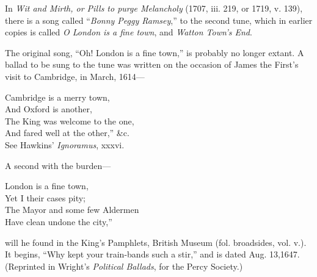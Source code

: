 In \textit{Wit and Mirth, or\textit{ Pills to purge Melancholy}} (1707, iii. 219, or 1719,
v. 139), there is a song called “\textit{Bonny Peggy Ramsey},” to the second tune,
which in earlier copies is called \textit{O London is a fine town}, and \textit{Watton Town’s End}.

The original song, “Oh! London is a fine town,” is probably no longer extant.
A ballad to be sung to the tune was written on the occasion of James the First’s
visit to Cambridge, in March, 1614—
\pagebreak

\settowidth{\versewidth}{The Mayor and some few Aldermen}
\begin{scverse}\begin{altverse}
Cambridge is a merry town,\\
And Oxford is another,\\
The King was welcome to the one,\\
And fared well at the other,” \&c.\\
\vin\vin\vin\vin See Hawkins’ \textit{Ignoramus}, xxxvi.
\end{altverse}
\end{scverse}
A second with the burden—
\begin{scverse}
\begin{altverse}
London is a fine town,\\
Yet I their cases pity;\\
The Mayor and some few Aldermen\\
Have clean undone the city,”
\end{altverse}
\end{scverse}
will he found in the King’s Pamphlets, British Museum (fol. broadsides, vol. v.).
It begins, “Why kept your train-bands such a stir,” and is dated Aug. 13,1647.
(Reprinted in Wright’s \textit{Political Ballads}, for the Percy Society.)

